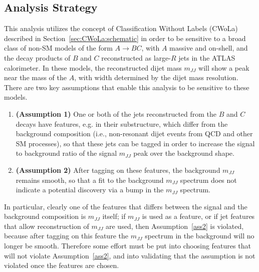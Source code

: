 \subsection{Analysis Strategy}
\label{sec:CWoLa:Analysis:Overview}
This analysis utilizes the concept of Classification Without Labels (CWoLa) described in Section~\ref{sec:CWoLa:schematic} in order to be sensitive to a broad class of non-SM models of the form $A\rightarrow BC$, with $A$ massive and on-shell, and the decay products of $B$ and $C$ reconstructed as large-$R$ jets in the ATLAS calorimeter.
In these models, the reconstructed dijet mass $m_{JJ}$ will show a peak near the mass of the $A$, with width determined by the dijet mass resolution.
There are two key assumptions that enable this analysis to be sensitive to these models.
\begin{enumerate}
  \item \textbf{(Assumption 1)} One or both of the jets reconstructed from the $B$ and $C$ decays have features, e.g. in their substructure, which differ from the background composition (i.e., non-resonant dijet events from QCD and other SM processes), so that these jets can be tagged in order to increase the signal to background ratio of the signal $m_{JJ}$ peak over the background shape. \label{ass1}
  \item \textbf{(Assumption 2)} After tagging on these features, the background $m_{JJ}$ remains smooth, so that a fit to the background $m_{JJ}$ spectrum does not indicate a potential discovery via a bump in the $m_{JJ}$ spectrum. \label{ass2}
\end{enumerate}
In particular, clearly one of the features that differs between the signal and the background composition is $m_{JJ}$ itself; if $m_{JJ}$ is used as a feature, or if jet features that allow reconstruction of $m_{JJ}$ are used, then Assumption~\ref{ass2} is violated, because after tagging on this feature the $m_{JJ}$ spectrum in the background will no longer be smooth.
Therefore some effort must be put into choosing features that will not violate Assumption~\ref{ass2}, and into validating that the assumption is not violated once the features are chosen.

